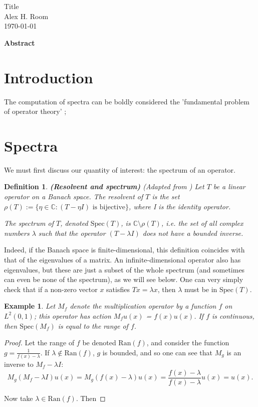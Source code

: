 \documentclass{article}
\newtheorem*{definition}{Definition}
\newtheorem{example}{Example}
\newcommand{\Spec}{\text{Spec}} %
\newcommand{\Ran}{\text{Ran}} %
\newcommand{\1}{\mathbf{1}} %
\begin{document}
  \begin{titlepage}
    \vspace*{\fill}
    \begin{center}
      {\Huge Title}\\[0.5cm]
      {\Large Alex H. Room}\\[0.4cm]
      {\Large \today}
    \end{center}
     \vspace{\fill}
     {\normalsize\textbf{Abstract} {\blindtext}}
     \vspace*{\fill}
  \end{titlepage}
\tableofcontents


\section{Introduction}
The computation of spectra can be boldly considered the 'fundamental problem of operator theory' \parencite{arveson2002short}; 

\section{Spectra}
We must first discuss our quantity of interest: the spectrum of an operator.
\begin{definition}{\textbf{(Resolvent and spectrum)}}
(Adapted from \parencite{evans2010partial}) Let $T$ be a linear operator on a Banach space.
The resolvent of $T$ is the set $\rho(T) := \{\eta \in \mathbb{C} : (T - \eta I)\text{ is bijective}\}$, where I is the identity operator. 

The spectrum of $T$, denoted
$\Spec(T)$, is $\mathbb{C} \setminus \rho(T)$, i.e. the set of all complex numbers $\lambda$ such that the operator $(T - \lambda I)$ does not have a bounded inverse.
\end{definition}
Indeed, if the Banach space is finite-dimensional, this definition coincides with that of the eigenvalues of a matrix. An infinite-dimensional operator also has eigenvalues, but these are just a subset of the whole spectrum (and sometimes can even be none of the spectrum), as we will see below. One can very simply check that if a non-zero vector $x$ satisfies $Tx = \lambda x$, then $\lambda$ must be in $\Spec(T)$.

\begin{example}
Let $M_f$ denote the multiplication operator by a function $f$ on $L^2(0, 1)$; this operator has action $M_f u(x)$ = $f(x)u(x)$. If $f$ is continuous, then $\Spec(M_f)$ is equal to the range of $f$.
\end{example}
\begin{proof}
Let the range of $f$ be denoted $\Ran(f)$, and consider the function $g = \frac{1}{f(x) - \lambda}$. If $\lambda \notin \Ran(f)$, $g$ is bounded, and so one can see that $M_g$ is an inverse to $M_f - \lambda I$:
$$M_g(M_f - \lambda I)u(x) = M_g(f(x) - \lambda)u(x) = \frac{f(x) - \lambda}{f(x) - \lambda}u(x) = u(x).$$

Now take $\lambda \in \Ran(f)$. Then 
\end{proof}

\printbibliography
\end{document}
